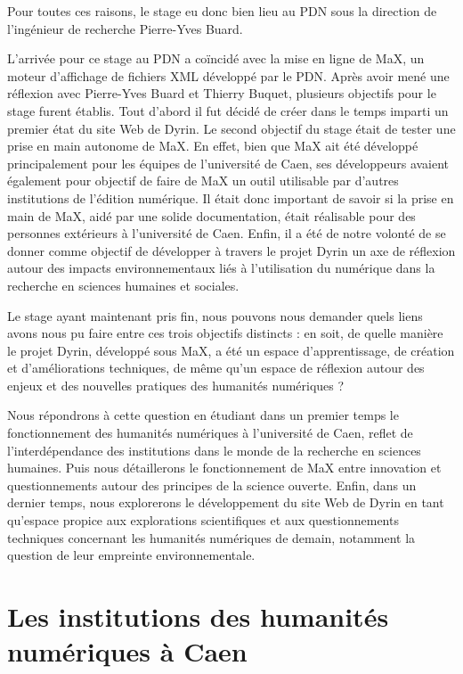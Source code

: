 \documentclass[a4paper,12pt,twoside]{book}
\begin{document}
Pour toutes ces raisons, le stage eu donc bien lieu au \acrshort{PDN} sous la direction de l'ingénieur de recherche Pierre-Yves Buard.

L'arrivée pour ce stage au \acrshort{PDN} a coïncidé avec la mise en ligne de MaX, un moteur d'affichage de fichiers XML développé par le \acrshort{PDN}. Après avoir mené une réflexion avec Pierre-Yves Buard et Thierry Buquet, plusieurs objectifs pour le stage furent établis.
Tout d'abord il fut décidé de créer dans le temps imparti un premier état du site Web de Dyrin. Le second objectif du stage était de tester une prise en main autonome de MaX. En effet, bien que MaX ait été développé principalement pour les équipes de l'université de Caen, ses développeurs avaient également pour objectif de faire de MaX un outil utilisable par d'autres institutions de l'édition numérique. Il était donc important de savoir si la prise en main de MaX, aidé par une solide documentation, était réalisable pour des personnes extérieurs à l'université de Caen. Enfin, il a été de notre volonté de se donner comme objectif de développer à travers le projet Dyrin un axe de réflexion autour des impacts environnementaux liés à l'utilisation du numérique dans la recherche en sciences humaines et sociales.

Le stage ayant maintenant pris fin, nous pouvons nous demander quels liens avons nous pu faire entre ces trois objectifs distincts : en soit, de quelle manière le projet Dyrin, développé sous MaX, a été un espace d'apprentissage, de création et d'améliorations techniques, de même qu'un espace de réflexion autour des enjeux et des nouvelles pratiques des humanités numériques ?

Nous répondrons à cette question en étudiant dans un premier temps le fonctionnement des humanités numériques à l'université de Caen, reflet de l'interdépendance des institutions dans le monde de la recherche en sciences humaines. Puis nous détaillerons le fonctionnement de MaX entre innovation et questionnements autour des principes de la science ouverte. Enfin, dans un dernier temps, nous explorerons le développement du site Web de Dyrin en tant qu'espace propice aux explorations scientifiques et aux questionnements techniques concernant les humanités numériques de demain, notamment la question de leur empreinte environnementale.

	\thispagestyle{empty}
	\cleardoublepage
	
	\mainmatter 
 
 \part{Les institutions des humanités numériques à Caen}
 
\end{document}
